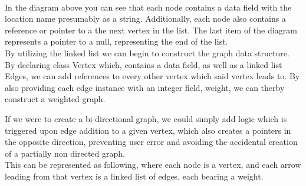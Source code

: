 \documentclass[a4paper]{article}
\begin{document}
 \\


In the diagram above you can see that each node
contains a data field with the location name presumably as a string. 
Additionally, each node also contains a reference or pointer to 
a the next vertex in the list. The last item of the diagram represents a pointer to 
a null, representing the end of the list. \\


By utilizing the linked list we can begin to construct the graph data structure.
By declaring class Vertex which, contains a data field, as well as a linked list Edges, 
we can add references to every other vertex which said vertex leads to.
By also providing each edge instance with an integer field, weight,
we can therby construct a weighted graph.

If we were to create a bi-directional graph, we could simply add logic which is triggered upon
edge addition to a given vertex, which also creates a pointers in the opposite direction, 
preventing user error and avoiding the accidental creation of a partially non directed graph. \\

\newpage
This can be represented as following, where each node is a vertex, and each arrow leading 
from that vertex is a linked list of edges, each bearing a weight. \\
\end{document}
